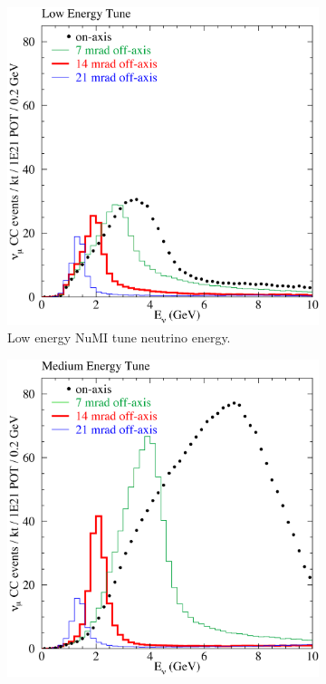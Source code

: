\begin{figure}
  \centering
  \begin{subfigure}[b]{0.45\textwidth}
    \includegraphics[width=\textwidth]{../../img/baird/beam/040-le-spectra.png}
    \caption{Low energy NuMI tune neutrino energy. \\ }
    \label{fig:NuESpectra_MEAndLE_a}
  \end{subfigure}
  \hfill
  \begin{subfigure}[b]{0.45\textwidth}
    \includegraphics[width=\textwidth]{../../img/baird/beam/050-me-spectra.png}

\end{subfigure}
\end{figure}

